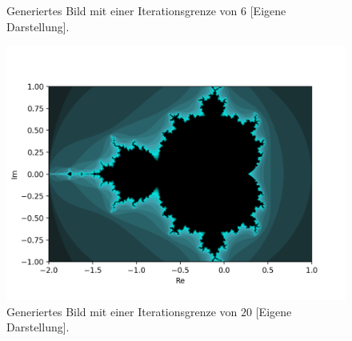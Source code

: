\begin{figure}[H]
\begin{minipage}[t]{0.48\textwidth}
  \vspace*{-8ex}
  \caption{Generiertes Bild mit einer Iterationsgrenze von $6$ [Eigene Darstellung].}
  \label{app:8.6}
\end{minipage}
\begin{minipage}[t]{\textwidth}
  \centering
  \includegraphics[width=0.48\linewidth]{images/maxBorder/20}
  \vspace*{-4ex}
  \caption{Generiertes Bild mit einer Iterationsgrenze von $20$ [Eigene Darstellung].}
  \label{app:8.7}
\end{minipage}
\label{fig:mandelbrot-set-max-border-2}
\end{figure}

